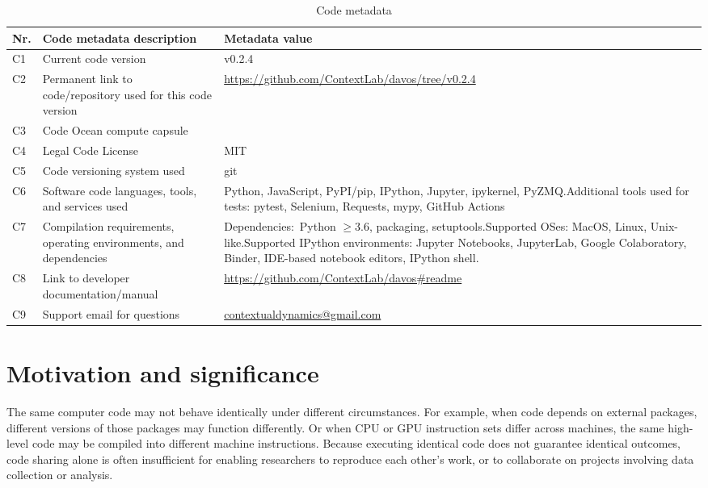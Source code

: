 \documentclass[preprint,12pt,a4paper]{elsarticle}
\begin{document}
\begin{table}[H]
\begin{tabular}{|l|p{6.5cm}|p{6.5cm}|}
\hline
\textbf{Nr.} & \textbf{Code metadata description} & \textbf{Metadata value} \\
\hline
C1 & Current code version &  v0.2.4 \\
\hline
C2 & Permanent link to code/repository used for this code version & \url{https://github.com/ContextLab/davos/tree/v0.2.4} \\
\hline
C3 & Code Ocean compute capsule & \\
\hline
C4 & Legal Code License & MIT \\
\hline
C5 & Code versioning system used & git \\
\hline
C6 & Software code languages, tools, and services used & Python, JavaScript, PyPI/pip, IPython, Jupyter, ipykernel, PyZMQ.\newline Additional tools used for tests: pytest, Selenium, Requests, mypy, GitHub Actions \\
\hline
C7 & Compilation requirements, operating environments, and
     dependencies & Dependencies:~Python $\geq 3.6$, packaging, setuptools.\newline Supported OSes: MacOS, Linux, Unix-like.\newline Supported IPython environments: Jupyter Notebooks, JupyterLab, Google Colaboratory, Binder, IDE-based notebook editors, IPython shell. \\
\hline
C8 & Link to developer documentation/manual & \url{https://github.com/ContextLab/davos\#readme} \\
\hline
C9 & Support email for questions & \href{mailto:contextualdynamics@gmail.com}{contextualdynamics@gmail.com} \\
\hline
\end{tabular}
\caption{Code metadata}
\label{}
\end{table}

\linenumbers


\section{Motivation and significance}

The same computer code may not behave identically under different
circumstances.  For example, when code depends on external packages,
different versions of those packages may function differently.  Or
when CPU or GPU instruction sets differ across machines, the same
high-level code may be compiled into different machine instructions.
Because executing identical code does not guarantee identical
outcomes, code sharing alone is often insufficient for enabling
researchers to reproduce each other's work, or to collaborate on
projects involving data collection or analysis.
\end{document}
